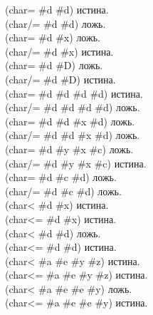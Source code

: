 \begin{defun}[Функция]
\begin{lisp}
(char= \#{\Xbackslash}d \#{\Xbackslash}d) \textrm{истина.} \\
(char/= \#{\Xbackslash}d \#{\Xbackslash}d) \textrm{ложь.} \\
(char= \#{\Xbackslash}d \#{\Xbackslash}x) \textrm{ложь.} \\
(char/= \#{\Xbackslash}d \#{\Xbackslash}x) \textrm{истина.} \\
(char= \#{\Xbackslash}d \#{\Xbackslash}D) \textrm{ложь.} \\
(char/= \#{\Xbackslash}d \#{\Xbackslash}D) \textrm{истина.} \\
(char= \#{\Xbackslash}d \#{\Xbackslash}d \#{\Xbackslash}d \#{\Xbackslash}d) \textrm{истина.} \\
(char/= \#{\Xbackslash}d \#{\Xbackslash}d \#{\Xbackslash}d \#{\Xbackslash}d) \textrm{ложь.} \\
(char= \#{\Xbackslash}d \#{\Xbackslash}d \#{\Xbackslash}x \#{\Xbackslash}d) \textrm{ложь.} \\
(char/= \#{\Xbackslash}d \#{\Xbackslash}d \#{\Xbackslash}x \#{\Xbackslash}d) \textrm{ложь.} \\
(char= \#{\Xbackslash}d \#{\Xbackslash}y \#{\Xbackslash}x \#{\Xbackslash}c) \textrm{ложь.} \\
(char/= \#{\Xbackslash}d \#{\Xbackslash}y \#{\Xbackslash}x \#{\Xbackslash}c) \textrm{истина.} \\
(char= \#{\Xbackslash}d \#{\Xbackslash}c \#{\Xbackslash}d) \textrm{ложь.} \\
(char/= \#{\Xbackslash}d \#{\Xbackslash}c \#{\Xbackslash}d) \textrm{ложь.} \\
(char< \#{\Xbackslash}d \#{\Xbackslash}x) \textrm{истина.} \\
(char<= \#{\Xbackslash}d \#{\Xbackslash}x) \textrm{истина.} \\
(char< \#{\Xbackslash}d \#{\Xbackslash}d) \textrm{ложь.} \\
(char<= \#{\Xbackslash}d \#{\Xbackslash}d) \textrm{истина.} \\
(char< \#{\Xbackslash}a \#{\Xbackslash}e \#{\Xbackslash}y \#{\Xbackslash}z) \textrm{истина.} \\
(char<= \#{\Xbackslash}a \#{\Xbackslash}e \#{\Xbackslash}y \#{\Xbackslash}z) \textrm{истина.} \\
(char< \#{\Xbackslash}a \#{\Xbackslash}e \#{\Xbackslash}e \#{\Xbackslash}y) \textrm{ложь.} \\
(char<= \#{\Xbackslash}a \#{\Xbackslash}e \#{\Xbackslash}e \#{\Xbackslash}y) \textrm{истина.} \\

\end{lisp}
\end{defun}
